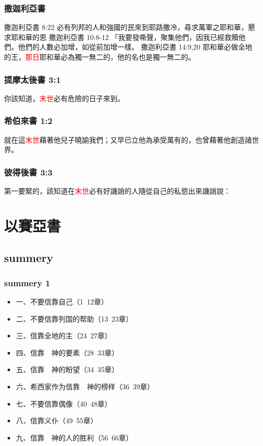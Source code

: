 \subsubsection{撒迦利亞書}
撒迦利亞書 8:22
必有列邦的人和強國的民來到耶路撒冷，尋求萬軍之耶和華，懇求耶和華的恩
撒迦利亞書 10:8-12
「我要發嘶聲，聚集他們，因我已經救贖他們。他們的人數必加增，如從前加增一樣。
撒迦利亞書 14:9,20
耶和華必做全地的王，\textcolor{red}{那日}耶和華必為獨一無二的，他的名也是獨一無二的。

\subsubsection{提摩太後書 3:1}
你該知道，\textcolor{red}{末世}必有危險的日子來到。

\subsubsection{希伯來書 1:2}
就在這\textcolor{red}{末世}藉著他兒子曉諭我們；又早已立他為承受萬有的，也曾藉著他創造諸世界。

\subsubsection{彼得後書 3:3}
第一要緊的，該知道在\textcolor{red}{末世}必有好譏誚的人隨從自己的私慾出來譏誚說：

\section{以賽亞書}
\subsection{summery}
\subsubsection{summery 1}
\begin{itemize}
\item 一、不要信靠自己（1~12章） 
\item 二、不要信靠列国的帮助（13~23章） 
\item 三、信靠全地的主（24~27章） 
\item 四、信靠　神的要素（28~33章） 
\item 五、信靠　神的盼望（34~35章） 
\item 六、希西家作为信靠　神的榜样（36~39章） 
\item 七、不要信靠偶像（40~48章） 
\item 八、信靠义仆（49~55章） 
\item 九、信靠　神的人的胜利（56~66章） 
\end{itemize}

